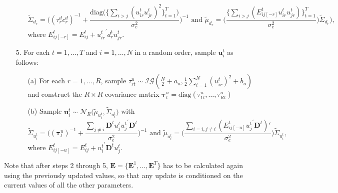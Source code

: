 \documentclass[a4paper]{article}
\begin{document}
\begin{itemize}
\begin{enumerate}
			$$\tilde{\Sigma}_{d_r} = \Big((\tau_r^d{c_r^d})^{-1}+\frac{\mbox{diag}\big(\{\sum_{i>j}({u^t_{ir}u^t_{jr}})^2\}_{t=1}^{T}\big)}{\sigma_e^2}\Big)^{-1} \mbox{ and } \tilde{\mu}_{d_r} =  \Big(\frac{\{\sum_{i>j}(E^{t}_{ij[-r]}u^t_{ir}u^t_{jr})\}_{t=1}^{T}}{\sigma_e^2}\Big)\tilde{\Sigma}_{d_r}),$$
			where $E^{t}_{ij[-r]}=E^t_{ij}+{u^t_{ir}}^\prime d^t_{r}u^t_{jr}$.
		\end{enumerate}		
		\item [5.] For each $t =1,\ldots,T$ and $i =1,\ldots,N$ in a random order, sample $\boldsymbol{u}^t_{i}$ as follows:
		\begin{enumerate}
			\item[(a)] For each $r =1,\ldots,R$, sample $\tau_{rt}^{u} \sim \mathcal{IG}(\frac{N}{2}+a_u, \frac{1}{2}\sum\limits_{i=1}^N (u^t_{ir})^2 + b_u)$ and construct the $R\times R$ covariance matrix $\boldsymbol{\tau}^u_t = \mbox{diag}(\tau_{1t}^{u},\ldots, \tau_{Rt}^{u})$
					\item [(b)] Sample $\boldsymbol{u}^t_{i}\sim \mathcal{N}_R\big(\tilde{\mu}_{u^t_{i}}, \tilde{\Sigma}_{u^t_{i}} \big)$ with 
			$$\tilde{\Sigma}_{u^t_{i}} = \Big((\boldsymbol{\tau}^u_t)^{-1}+\frac{\sum_{j\neq i}\mathbf{D}^tu^t_{j}{u^t_{j}}^\prime \mathbf{D}^t}{\sigma_e^2}\Big)^{-1}\mbox{ and } \tilde{\mu}_{u^t_{i}} = \Big(\frac{\sum_{i=i, j\neq i}(E^{t}_{ij[-u]}{u^t_{j}}^\prime \mathbf{D}^t)'}{{\sigma_e^2}}\Big)\tilde{\Sigma}_{u^t_{i}},$$ 
			where $E^{t}_{ij[-u]}=E^t_{ij}+{u^t_{i}}^\prime \mathbf{D}^tu^t_{j}.$
		\end{enumerate}			
	\end{itemize}
	Note that after steps 2 through 5, $\mathbf{E} = \{\mathbf{E}^1,\ldots, \mathbf{E}^T\}$ has to be calculated again using the previously updated values, so that any update is conditioned on the current values of all the other parameters. 
\end{document}
